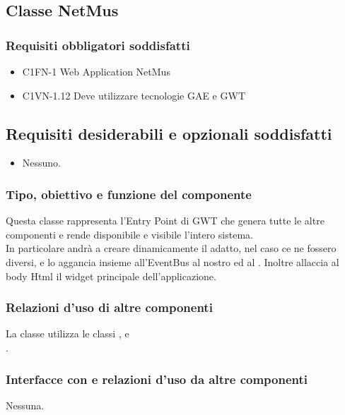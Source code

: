 \subsection{Classe NetMus}
\subsubsection*{Requisiti obbligatori soddisfatti}
\begin{itemize}
	\item C1FN-1 Web Application NetMus
	\item C1VN-1.12 Deve utilizzare tecnologie GAE e GWT
\end{itemize}
\subsection*{Requisiti desiderabili e opzionali soddisfatti}
\begin{itemize}
  \item Nessuno.
\end{itemize}
\subsubsection*{Tipo, obiettivo e funzione del componente}
Questa classe rappresenta l'Entry Point di GWT che genera tutte le altre
componenti e rende disponibile e visibile l'intero sistema.\\
In particolare andr\`a a creare dinamicamente il  adatto,
nel caso ce ne fossero diversi, e lo aggancia insieme all'EventBus al nostro
 ed al .
Inoltre allaccia al body Html il widget principale dell'applicazione.
\subsubsection*{Relazioni d'uso di altre componenti}
La classe  utilizza le classi ,
 e \\.
\subsubsection*{Interfacce con e relazioni d'uso da altre componenti}
Nessuna.

